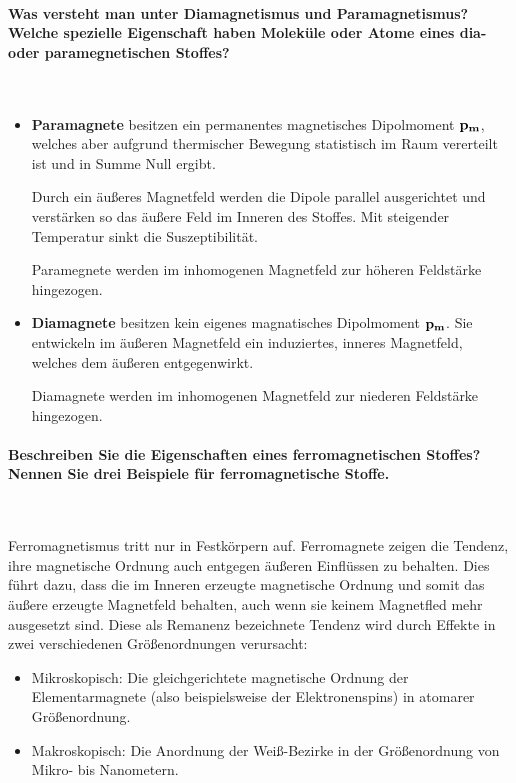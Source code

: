 \documentclass[a4paper, 11pt, parskip=half]{scrartcl}
\begin{document}
\paragraph{Was versteht man unter Diamagnetismus und Paramagnetismus? Welche spezielle Eigenschaft
haben Moleküle oder Atome eines dia- oder paramegnetischen Stoffes?} ~

\begin{itemize}
    \item \textbf{Paramagnete} besitzen ein permanentes magnetisches Dipolmoment
        $\bold{p_m}$, welches aber aufgrund thermischer Bewegung statistisch im Raum 
        vererteilt ist und in Summe Null ergibt.
        
        Durch ein äußeres Magnetfeld werden die Dipole parallel ausgerichtet und verstärken
        so das äußere Feld im Inneren des Stoffes. Mit steigender Temperatur sinkt die
        Suszeptibilität.
        
        Paramegnete werden im inhomogenen Magnetfeld zur höheren Feldstärke hingezogen.
        
    \item \textbf{Diamagnete} besitzen kein eigenes magnatisches Dipolmoment $\bold{p_m}$.
        Sie entwickeln im  äußeren Magnetfeld ein induziertes, inneres Magnetfeld, welches
        dem äußeren entgegenwirkt.
        
        Diamagnete werden im inhomogenen Magnetfeld zur niederen Feldstärke hingezogen.
\end{itemize}

\paragraph{Beschreiben Sie die Eigenschaften eines ferromagnetischen Stoffes? Nennen Sie drei
Beispiele für ferromagnetische Stoffe.} ~

Ferromagnetismus tritt nur in Festkörpern auf. Ferromagnete zeigen die Tendenz, ihre magnetische
Ordnung auch entgegen äußeren Einflüssen zu behalten. Dies führt dazu, dass die im Inneren erzeugte
magnetische Ordnung und somit das äußere erzeugte Magnetfeld behalten, auch wenn sie keinem
Magnetfled mehr ausgesetzt sind. Diese als Remanenz bezeichnete Tendenz wird durch Effekte in zwei
verschiedenen Größenordnungen verursacht:

\begin{itemize}
    \item Mikroskopisch: Die gleichgerichtete magnetische Ordnung der Elementarmagnete (also
        beispielsweise der Elektronenspins) in atomarer Größenordnung.
        
    \item Makroskopisch: Die Anordnung der Weiß-Bezirke in der Größenordnung von Mikro- bis
        Nanometern.
\end{itemize}
\end{document}
